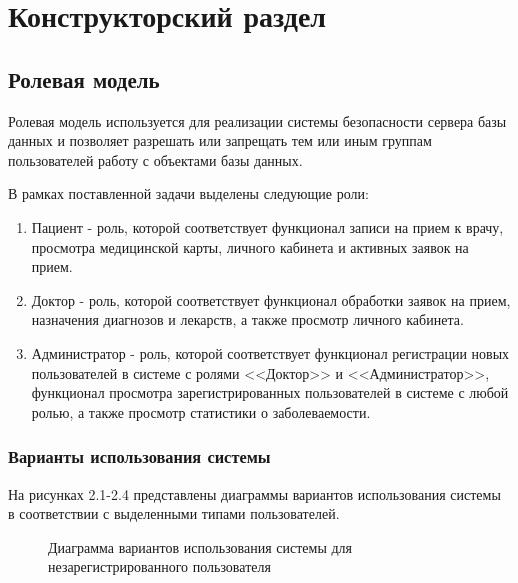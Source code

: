 \chapter{Конструкторский раздел}
\label{cha:design}


\section{Ролевая модель}

Ролевая модель используется для реализации системы безопасности сервера базы данных и  позволяет разрешать или запрещать тем или иным группам пользователей работу с объектами базы данных. %


В рамках поставленной задачи выделены следующие роли:

\begin{enumerate}
	\item Пациент - роль, которой соответствует функционал записи на прием к врачу, просмотра медицинской карты, личного кабинета и активных заявок на прием.
	\item Доктор - роль, которой соответствует функционал обработки заявок на прием, назначения диагнозов и лекарств, а также просмотр личного кабинета.
	\item Администратор - роль, которой соответствует функционал регистрации новых пользователей в системе с ролями <<Доктор>> и <<Администратор>>, функционал просмотра зарегистрированных пользователей в системе с любой ролью, а также просмотр статистики о заболеваемости.
\end{enumerate}


\subsection*{Варианты использования системы}

На рисунках 2.1-2.4 представлены диаграммы вариантов использования системы в соответствии с выделенными типами пользователей.

\begin{figure}[!h]
	\caption{Диаграмма вариантов использования системы для незарегистрированного пользователя}
\end{figure}

